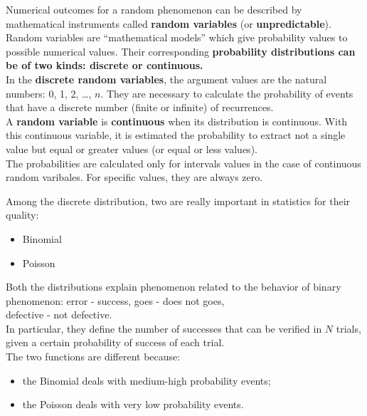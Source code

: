 \begin{frame}
  Numerical outcomes for a random phenomenon can be described by mathematical instruments called \textbf{random variables} (or \textbf{unpredictable}).\\
  \vspace*{.2cm}
  Random variables are ``mathematical models'' which give probability values to possible numerical values. Their corresponding \textbf{probability distributions can be of two kinds: discrete or continuous.}\\
  \vspace*{.2cm}
  In the \textbf{discrete random variables}, the argument values are the natural numbers: 0, 1, 2, \dots, $ n $. They are necessary to calculate the probability of events that have a discrete number (finite or infinite) of recurrences.\\
  \vspace*{.2cm}
  A \textbf{random variable} is \textbf{continuous} when its distribution is continuous. With this continuous variable, it is estimated the probability to extract not a single value but equal or greater values (or equal or less values).\\
  The probabilities are calculated only for intervals values in the case of continuous random varibales. For specific values, they are always zero.
\end{frame}




\begin{frame}
  Among the discrete distribution, two are really important in statistics for their quality:\\
  \begin{itemize}
    \item Binomial
    \item Poisson
  \end{itemize}
  Both the distributions explain phenomenon related to the behavior of binary phenomenon: error - success, goes - does not goes, \\defective - not defective.\\
  \vspace*{.2cm}
  In particular, they define the number of successes that can be verified in $ N $ trials, given a certain probability of success of each trial.\\
  \vspace*{.2cm}
  The two functions are different because:
  \begin{itemize}
    \item the Binomial deals with medium-high probability events;
    \item the Poisson deals with very low probability events.
  \end{itemize}
\end{frame}

